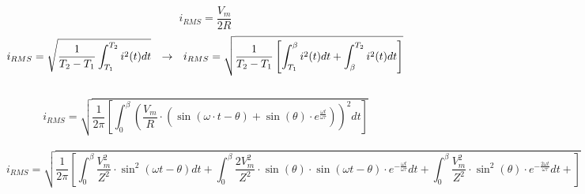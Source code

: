 \documentclass{article}
\begin{document}
        \[
            \boxed{i_{RMS} = \frac{V_{m}}{2R}}
        \]
\newpage
        \[
            i_{RMS} = \sqrt{\frac{1}{T_{2} - T_{1}} \int_{T_{1}}^{T_{2}} i^{2}(t) dt}
            \hspace{2.5mm}
            \to
            \hspace{2.5mm}
            i_{RMS} = \sqrt{\frac{1}{T_{2} - T_{1}} \left[ \int_{T_{1}}^{\beta} i^{2}(t) dt + \int_{\beta}^{T_{2}} i^{2}(t) dt \right]}
        \]\\
        \[
            i_{RMS} = 
                    \sqrt{ \frac{1}{2 \pi}
                        \left[
                            \int_{0}^{\beta} {
                                \left(
                                    \frac{V_{m}}{R} \cdot (\sin(\omega \cdot t - \theta) + \sin(\theta) \cdot e^{\frac{\omega t}{\omega \tau}} )
                                \right)}^{2} dt 
                        \right]
                    }
        \]\\
        \[
            \boxed{
                i_{RMS} = 
                    \sqrt{
                        \frac{1}{2\pi}
                            \left[
                                \int_{0}^{\beta}
                                    \frac{V_{m}^{2}}{Z^{2}} \cdot \sin^{2}(\omega t - \theta) dt +
                                \int_{0}^{\beta}
                                    \frac{2 V_{m}^{2}}{Z^{2}} \cdot \sin(\theta) \cdot \sin(\omega t - \theta) \cdot e^{-\frac{\omega t}{\omega \tau}} dt +
                                \int_{0}^{\beta}
                                    \frac{V_{m}^{2}}{Z^{2}} \cdot \sin^{2}(\theta) \cdot e^{-\frac{2\omega t}{\omega \tau}} dt +
                            \right]
                    }
            }
        \]\\
\end{document}
